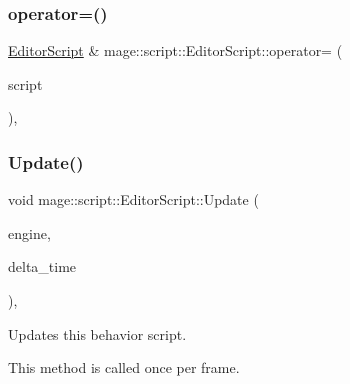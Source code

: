 \hypertarget{classmage_1_1script_1_1_editor_script_a87df2b20fee97f6aa9e09b4b5c9282a5}{}\label{classmage_1_1script_1_1_editor_script_a87df2b20fee97f6aa9e09b4b5c9282a5} 
\subsubsection{\texorpdfstring{operator=()}{operator=()}\hspace{0.1cm}{\footnotesize\ttfamily [2/2]}}
{\footnotesize\ttfamily \hyperlink{classmage_1_1script_1_1_editor_script}{Editor\+Script} \& mage\+::script\+::\+Editor\+Script\+::operator= (\begin{DoxyParamCaption}\item[{\hyperlink{classmage_1_1script_1_1_editor_script}{Editor\+Script} \&\&}]{script }\end{DoxyParamCaption})\hspace{0.3cm}{\ttfamily [default]}, {\ttfamily [noexcept]}}

\hypertarget{classmage_1_1script_1_1_editor_script_a6212864947b7db1a01b19d2683106b36}{}\label{classmage_1_1script_1_1_editor_script_a6212864947b7db1a01b19d2683106b36} 
\subsubsection{\texorpdfstring{Update()}{Update()}}
{\footnotesize\ttfamily void mage\+::script\+::\+Editor\+Script\+::\+Update (\begin{DoxyParamCaption}\item[{\mbox{[}\mbox{[}maybe\+\_\+unused\mbox{]} \mbox{]} \hyperlink{classmage_1_1_engine}{Engine} \&}]{engine,  }\item[{\mbox{[}\mbox{[}maybe\+\_\+unused\mbox{]} \mbox{]} \hyperlink{namespacemage_ad26233bbec640deda836e572c1a23708}{F64}}]{delta\+\_\+time }\end{DoxyParamCaption})\hspace{0.3cm}{\ttfamily [override]}, {\ttfamily [virtual]}}

Updates this behavior script.

This method is called once per frame.


